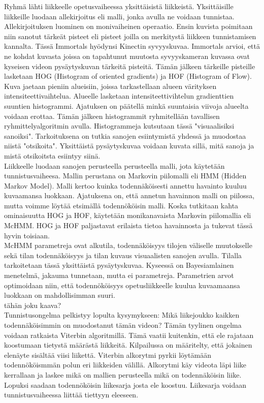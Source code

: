 Ryhmä lähti liikkeelle opetusvaiheessa yksittäisistä liikkeistä. Yksittäisille liikkeille luodaan allekirjoitus eli malli,
jonka avulla ne voidaan tunnistaa. Allekirjoituksen luominen on monivaiheinen operaatio. Ensin kuvista poimitaan niin sanotut
tärkeät pisteet eli pisteet joilla on merkitystä liikkeen tunnistamisen kannalta. Tässä Immortals hyödynsi Kinectin syvyyskuvaa.
Immortals arvioi, että ne kohdat kuvasta joissa on tapahtunut muutosta syvyyskameran kuvassa ovat kyseisen videon pysäytyskuvan
tärkeitä pisteitä. Tämän jälkeen tärkeille pisteille lasketaan HOG (Histogram of oriented gradients) ja HOF (Histogram of Flow). 
Kuva jaetaan pieniin alueisiin, joissa tarkastellaan alueen värityksen intensiteettivaihtelua.
Alueelle lasketaan intensiteettivihtelun gradienttien suuntien histogrammi. Ajatuksen on päätellä minkä suuntaisia 
viivoja alueelta voidaan erottaa. Tämän jälkeen histogrammit ryhmitellään tavallisen ryhmittelyalgoritmin avulla.
Histogrammeja kutsutaan tässä "visuaalisiksi sanoiksi". Tarkoituksena on tutkia sanojen esiintymistä yhdessä ja muodostaa niistä "otsikoita". 
Yksittäistä pysäytyskuvaa voidaan kuvata sillä, mitä sanoja ja mistä otsikoitsta esiintyy siinä.\\

Liikkeelle luodaan sanojen perusteella perusteella malli, jota käytetään tunnistusvaiheesa. Mallin perustana on Markovin piilomalli 
eli HMM (Hidden Markov Model). Malli kertoo kuinka todennäköisesti annettu havainto kuuluu kuvaamansa luokkaan. 
Ajatuksena on, että annetun havainnon malli on piilossa, mutta voimme löytää etsimällä todennököisin malli.
Koska tutkitaan kahta ominaisuutta HOG ja HOF, käytetään monikanavaista Markovin piilomallia eli McHMM. 
HOG ja HOF paljastavat erilaista tietoa havainnosta ja tukevat tässä hyvin toisiaan.\\

McHMM parametreja ovat alkutila, todennäköisyys tilojen väliselle muutokselle sekä tilan todennäköisyys ja tilan kuvaus visuaalisten sanojen avulla. 
Tilalla tarkoitetaan tässä yksittäistä pysäytyskuvaa. Kyseessä on Bayesiamlainen menetelmä, jakauma tunnetaan, mutta ei parametreja.
Parametrien arvot optimoidaan niin, että todennököisyys opetusliikkeelle kuulua kuvaamaansa luokkaan on mahdollisimman suuri.\\
tähän joku kaava? \\

Tunnistusongelma pelkistyy lopulta kysymykseen: Mikä liikejoukko kaikken todennäköisimmin on muodostanut tämän videon?
Tämän tyylinen ongelma voidaan ratkaista Viterbin algoritmillä. Tämä vaatii kuitenkin, että ele rajataan koostumaan tietystä määrästä liikkeitä.
Kilpailussa on määritelty, että jokainen elenäyte sisältää viisi liikettä.
Viterbin alkorytmi pyrkii löytämään todennököismmän polun eri liikkeiden välillä. Alkorytmi käy videota läpi liike kerrallaan ja laskee mikä
on mallien perusteella mikä on todennäköisin liike. Lopuksi saadaan todennököisin liikesarja josta ele koostuu.
Liikesarja voidaan tunnistusvaiheessa liittää tiettyyn eleeseen.\\

